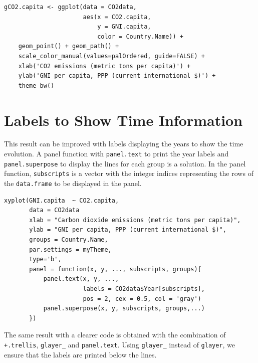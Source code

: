 \lstset{language=r,label= ,caption= ,captionpos=b,numbers=none}
\begin{lstlisting}
gCO2.capita <- ggplot(data = CO2data,
                      aes(x = CO2.capita,
                          y = GNI.capita,
                          color = Country.Name)) +
    geom_point() + geom_path() +
    scale_color_manual(values=palOrdered, guide=FALSE) +
    xlab('CO2 emissions (metric tons per capita)') +
    ylab('GNI per capita, PPP (current international $)') +
    theme_bw()
\end{lstlisting}

\section{Labels to Show Time Information}
\label{sec:orgadfbb09}
This result can be improved with labels displaying the years to show
the time evolution.  A panel function with \texttt{panel.text} to print the
year labels and \texttt{panel.superpose} to display the lines for each group
is a solution. In the panel function, \texttt{subscripts} is a vector with
the integer indices representing the rows of the \texttt{data.frame} to be
displayed in the panel.



\lstset{language=r,label= ,caption= ,captionpos=b,numbers=none}
\begin{lstlisting}
xyplot(GNI.capita  ~ CO2.capita,
       data = CO2data
       xlab = "Carbon dioxide emissions (metric tons per capita)",
       ylab = "GNI per capita, PPP (current international $)",
       groups = Country.Name,
       par.settings = myTheme,
       type='b',
       panel = function(x, y, ..., subscripts, groups){
           panel.text(x, y, ...,
                      labels = CO2data$Year[subscripts],
                      pos = 2, cex = 0.5, col = 'gray')
           panel.superpose(x, y, subscripts, groups,...)
       })
\end{lstlisting}

The same result with a clearer code is obtained with the combination
of \texttt{+.trellis}, \texttt{glayer\_} and \texttt{panel.text}. Using \texttt{glayer\_} instead of
\texttt{glayer}, we ensure that the labels are printed below the lines.



